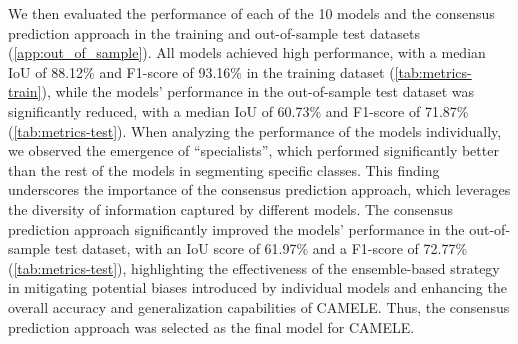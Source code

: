 We then evaluated the performance of each of the 10 models and the consensus
prediction approach in the training and out-of-sample test datasets
(\cref{app:out_of_sample}). All models achieved high performance, with a median
IoU of 88.12\% and F1-score of 93.16\% in the training dataset
(\cref{tab:metrics-train}), while the models' performance in the out-of-sample
test dataset was significantly reduced, with a median IoU of 60.73\% and
F1-score of 71.87\% (\cref{tab:metrics-test}). When analyzing the performance
of the models individually, we observed the emergence of ``specialists'', which
performed significantly better than the rest of the models in segmenting
specific classes. This finding underscores the importance of the consensus
prediction approach, which leverages the diversity of information captured by
different models. The consensus prediction approach significantly improved the
models' performance in the out-of-sample test dataset, with an IoU score of
61.97\% and a F1-score of 72.77\% (\cref{tab:metrics-test}), highlighting the
effectiveness of the ensemble-based strategy in mitigating potential biases
introduced by individual models and enhancing the overall accuracy and
generalization capabilities of CAMELE. Thus, the consensus prediction approach
was selected as the final model for CAMELE.